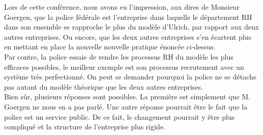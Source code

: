 Lors de cette conférence, nous avons eu l'impression, aux dires de Monsieur Goergen, que la police fédérale est l'entreprise dans laquelle le département RH dans son ensemble se rapproche le plus du modèle d'Ulrich, par rapport aux deux autres entreprises. Ou encore, que les deux autres entreprises s'en écartent plus en mettant en place la nouvelle nouvelle pratique énoncée ci-dessus.\\
Par contre, la police essaie de rendre les processus RH du modèle les plus efficaces possibles, le meilleur exemple est son processus recrutement avec un système très perfectionné. On peut se demander pourquoi la police ne se détache pas autant du modèle théorique que les deux autres entreprises.\\
Bien sûr, plusieurs réponses sont possibles. La première est simplement que M. Goergen ne nous en a pas parlé. Une autre réponse pourrait être le fait que la police est un service public. De ce fait, le changement pourrait y être plus compliqué et la structure de l'entreprise plus rigide.\newline